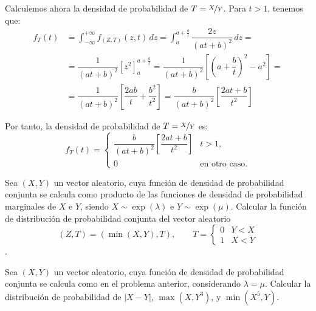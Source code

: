 \begin{ejercicio}
    Calculemos ahora la densidad de probabilidad de $T=\nicefrac{X}{Y}$. Para $t>1$, tenemos que:
    \begin{align*}
        f_T(t)&=\int_{-\infty}^{+\infty} f_{(Z,T)}(z, t) \, dz
        = \int_{a}^{a+\frac{b}{t}} \dfrac{2z}{(at+b)^2} \, dz
        =\\&= \dfrac{1}{(at+b)^2}\left[z^2\right]_{a}^{a+\frac{b}{t}}
        = \dfrac{1}{(at+b)^2}\left[\left(a+\dfrac{b}{t}\right)^2-a^2\right]
        =\\&= \dfrac{1}{(at+b)^2}\left[\dfrac{2ab}{t}+\dfrac{b^2}{t^2}\right]
        = \dfrac{b}{(at+b)^2}\left[\dfrac{2at+b}{t^2}\right]
    \end{align*}

    Por tanto, la densidad de probabilidad de $T=\nicefrac{X}{Y}$ es:
    \begin{equation*}
        f_T(t) = \begin{cases}
            \dfrac{b}{(at+b)^2}\left[\dfrac{2at+b}{t^2}\right] & t>1, \\
            0 & \text{en otro caso}.
        \end{cases}
    \end{equation*}


\end{ejercicio}

\begin{ejercicio}
    Sea $(X,Y)$ un vector aleatorio, cuya función de densidad de probabilidad conjunta se calcula como producto de las funciones de densidad de probabilidad marginales de $X$ e $Y$, siendo $X\sim\exp(\lambda)$ e $Y\sim\exp(\mu)$. Calcular la función de distribución de probabilidad conjunta del vector aleatorio
    $$(Z,T)=(\min(X,Y),T),\qquad T=\begin{cases} 0 & Y<X \\ 1 & X<Y \end{cases}$$.
\end{ejercicio}

\begin{ejercicio}
    Sea $(X,Y)$ un vector aleatorio, cuya función de densidad de probabilidad conjunta se calcula como en el problema anterior, considerando $\lambda=\mu$. Calcular la distribución de probabilidad de $|X-Y|$, $\max(X,Y^3)$, y $\min(X^5,Y)$.
\end{ejercicio}

